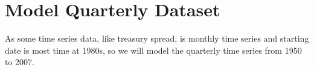 \documentclass[12pt]{article}
\theoremstyle{definition}
\numberwithin{equation}{section}
\numberwithin{figure}{section}
\numberwithin{table}{section}
\begin{document}
\section{Model Quarterly Dataset}

As some time series data, like treasury spread, is monthly time series and starting date is most time at 1980s, so we will model the quarterly time series from 1950 to 2007.


















\newpage


\end{document}
